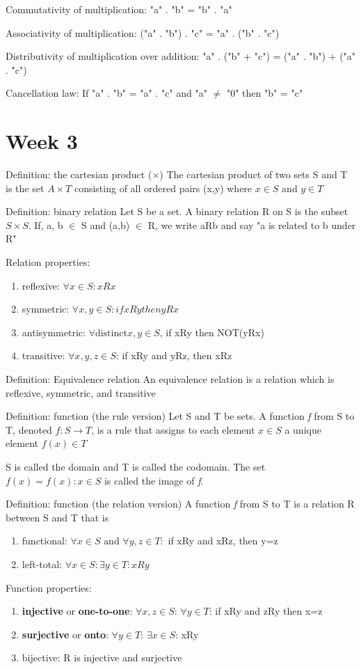 \documentclass{article}
\begin{document}
Commutativity of multiplication: "a" . "b" = "b" . "a"

Associativity of multiplication: ("a" . "b") . "c" = "a" . ("b" . "c")

Distributivity of multiplication over addition: "a" . ("b" + "c") = ("a" . "b") + ("a" . "c")

Cancellation law: If "a" . "b" = "a" . "c" and "a" \(\neq\) "0" then "b" = "c"
\section{Week 3}
Definition: the cartesian product (\(\times\))
The cartesian product of two sets S and T is the set \(A \times T\) consisting of all ordered pairs (x,y) where \(x \in S\) and \(y \in T\)

Definition: binary relation
Let S be a set. A binary relation R on S is the subset \(S\times S\). If, a, b \(\in\) S and (a,b) \(\in\) R, we write aRb and say "a is related to b under R"

Relation properties:
\begin{enumerate}
    \item reflexive:
    \(\forall x \in S: xRx\)
    \item symmetric: 
    \(\forall x,y \in S: if xRy then yRx\)
    \item antisymmetric: 
    \(\forall \text{distinct} x,y \in S\), if xRy then NOT(yRx)
    \item transitive:
    \(\forall x,y,z \in S\): if xRy and yRz, then xRz
\end{enumerate}

Definition: Equivalence relation
An equivalence relation is a relation which is reflexive, symmetric, and transitive

Definition: function (the rule version)
Let S and T be sets. A function \textit{f} from S to T, denoted \(f:S \to T\), is a rule that assigns to each element \(x \in S\) a unique element \(f(x) \in T\)

S is called the domain and T is called the codomain. The set \(f(x) = {f(x): x\in S}\) is called the image of \textit{f}.

Definition: function (the relation version)
A function \textit{f} from S to T is a relation R between S and T that is 
\begin{enumerate}
    \item functional:
    \(\forall x \in S \text{\ and\ } \forall y,z \in T:\) if xRy and xRz, then y=z
    \item left-total: 
    \(\forall x \in S: \exists y \in T: xRy\)

\end{enumerate}
Function properties:
\begin{enumerate}
    \item \textbf{injective} or \textbf{one-to-one}:
    \(\forall x,z \in S\): \(\forall y \in T\): if xRy and zRy then x=z
    \item \textbf{surjective} or \textbf{onto}:
    \(\forall y \in T\): \(\exists x \in S\): xRy
    \item bijective:
    R is injective and surjective
\end{enumerate}
\end{document}
